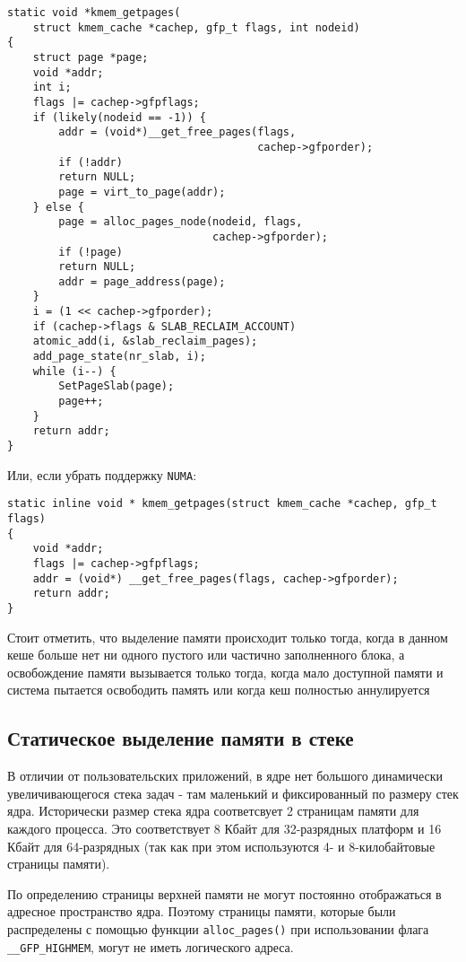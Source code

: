\documentclass[12pt]{article}
\begin{document}
\begin{lstlisting}
static void *kmem_getpages(
    struct kmem_cache *cachep, gfp_t flags, int nodeid)
{
    struct page *page;
    void *addr;
    int i;
    flags |= cachep->gfpflags;
    if (likely(nodeid == -1)) {
        addr = (void*)__get_free_pages(flags,
                                       cachep->gfporder);
        if (!addr)
        return NULL;
        page = virt_to_page(addr);
    } else {
        page = alloc_pages_node(nodeid, flags,
                                cachep->gfporder);
        if (!page)
        return NULL;
        addr = page_address(page);
    }
    i = (1 << cachep->gfporder);
    if (cachep->flags & SLAB_RECLAIM_ACCOUNT)
    atomic_add(i, &slab_reclaim_pages);
    add_page_state(nr_slab, i);
    while (i--) {
        SetPageSlab(page);
        page++;
    }
    return addr;
}
\end{lstlisting}

Или, если убрать поддержку \verb!NUMA!:

\begin{lstlisting}
static inline void * kmem_getpages(struct kmem_cache *cachep, gfp_t flags)
{
    void *addr;
    flags |= cachep->gfpflags;
    addr = (void*) __get_free_pages(flags, cachep->gfporder);
    return addr;
}
\end{lstlisting}

Стоит отметить, что выделение памяти происходит только тогда, когда в данном кеше больше нет ни одного пустого или частично
заполненного блока, а освобождение памяти вызывается только тогда, когда мало доступной памяти и система пытается освободить память
или когда кеш полностью аннулируется 

\pagebreak
\subsection*{Статическое выделение памяти в стеке}
В отличии от пользовательских приложений, в ядре нет большого динамически увеличивающегося стека задач - там маленький и фиксированный по размеру стек ядра.
Исторически размер стека ядра соответсвует 2 страницам памяти для каждого процесса. Это соответствует 8 Кбайт для 32-разрядных платформ и 16 Кбайт для
64-разрядных (так как при этом используются 4- и 8-килобайтовые страницы памяти).

По определению страницы верхней памяти не могут постоянно отображаться в адресное пространство ядра.
Поэтому страницы памяти, которые были распределены с помощью функции \verb!alloc_pages()! при использовании флага \verb!__GFP_HIGHMEM!, могут
не иметь логического адреса.
\end{document}
